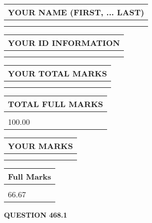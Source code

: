 \documentclass{ctexart}
\begin{document}
   
   
   
\newpage 
\setcounter{page}{ 
   468001 } 
   
   
   
   
\noindent\begin{tabular}{|l|}
\hline
YOUR NAME (FIRST, ... LAST)  \\
\hline
 \\ 
 \\ 
\hline
\end{tabular}
\hspace{0.05in} \begin{tabular}{|l|}
\hline
 YOUR   ID   INFORMATION  \\
\hline
 \\ 
 \\ 
\hline
\end{tabular}
   
   
\vspace{0.2in}\noindent\begin{tabular}{|l|}
\hline
YOUR TOTAL MARKS  \\
\hline
 \\ 
 \\ 
\hline
\end{tabular}
\hspace{0.05in} \begin{tabular}{|l|}
\hline
TOTAL FULL MARKS  \\
\hline
 \\ 
100.00 \\
\hline
\end{tabular}
   
   
 \vspace{0.2in}
 
 
 
 
   
   
  
\vspace{0.2in}
  
\noindent\begin{tabular}{|l|}
\hline
 YOUR MARKS  \\
\hline
 \\ 
 \\ 
\hline
\end{tabular}
\hspace{0.05in} \begin{tabular}{|l|}
\hline
 Full Marks  \\
\hline
 \\ 
66.67 \\
\hline
\end{tabular}
{\textbf{\Large{QUESTION
468.1 
}}}
  
\end{document}
